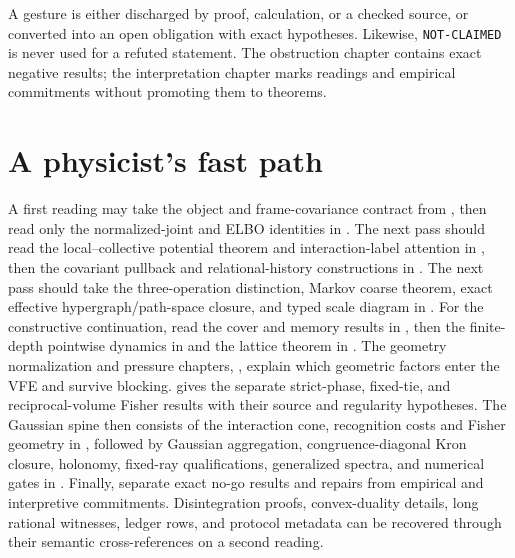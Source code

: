 A gesture is either discharged by proof, calculation, or a checked source, or
converted into an open obligation with exact hypotheses.  Likewise,
\texttt{NOT-CLAIMED} is never used for a refuted statement.  The obstruction
chapter contains exact negative results; the interpretation chapter marks
readings and empirical commitments without promoting them to theorems.

\section*{A physicist's fast path}

A first reading may take the object and frame-covariance contract from
, then read only the normalized-joint and
ELBO identities in .  The next pass
should read the local--collective potential theorem and interaction-label
attention in , then the covariant pullback and
relational-history constructions in
.  The next pass should
take the three-operation distinction, Markov coarse theorem, exact effective
hypergraph/path-space closure, and typed scale diagram in
.
For the constructive continuation, read the cover and memory results in
, then the finite-depth
pointwise dynamics in  and the lattice theorem
in . The geometry normalization and pressure
chapters, , explain which
geometric factors enter the VFE and survive blocking.
 gives the separate strict-phase,
fixed-tie, and reciprocal-volume Fisher results with their source and
regularity hypotheses.
The Gaussian spine then consists of the interaction cone,
recognition costs and Fisher geometry in
, followed by Gaussian
aggregation, congruence-diagonal Kron closure, holonomy, fixed-ray
qualifications, generalized spectra, and numerical gates in
.  Finally,
 separate exact no-go results and repairs
from empirical and interpretive commitments.  Disintegration proofs,
convex-duality details, long rational witnesses, ledger rows, and protocol
metadata can be recovered through their semantic cross-references on a second
reading.
